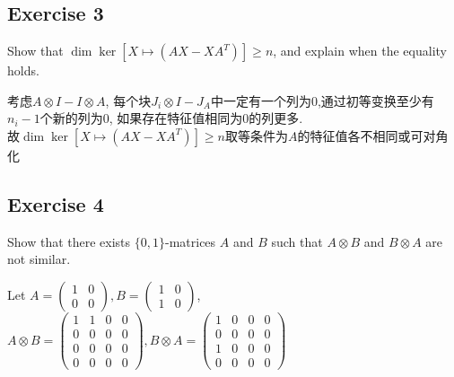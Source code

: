\documentclass[11pt]{ctexart}
\theoremstyle{definition}
\numberwithin{equation}{section}
\theoremstyle{definition}
\theoremstyle{remark}
\begin{document}
\subsection{Exercise 3}
Show that $\dim \ker [X \mapsto (AX - XA^T)] \geq n$, and explain when the equality holds.
\begin{aaa}
    考虑$A\otimes I - I\otimes A$, 每个块$J_i\otimes I-J_A$中一定有一个列为0,通过初等变换至少有$n_i-1$个新的列为0, 如果存在特征值相同为0的列更多.\\
    故$\dim \ker [X \mapsto (AX - XA^T)] \geq n$取等条件为$A$的特征值各不相同或可对角化
\end{aaa}
\subsection{Exercise 4}
             Show that there exists $\{0,1\}$-matrices $A$ and $B$ such that $A\otimes B$ and $B\otimes A$ are not similar.
\begin{aaa}
    Let $A=\begin{pmatrix}
        1 & 0\\
        0 & 0\end{pmatrix}, B=\begin{pmatrix}
        1 & 0\\1&0 \end{pmatrix}$,\\
    $A\otimes B=\begin{pmatrix}
        1 & 1 & 0 & 0\\
        0 & 0 & 0 & 0\\
        0 & 0 & 0 & 0\\
        0 & 0 & 0 & 0\end{pmatrix}, B\otimes A=\begin{pmatrix}
        1 & 0 & 0 & 0\\
        0 & 0 & 0 & 0\\
        1 & 0 & 0 & 0\\
        0 & 0 & 0 & 0\end{pmatrix}$
\end{aaa}
\end{document}
